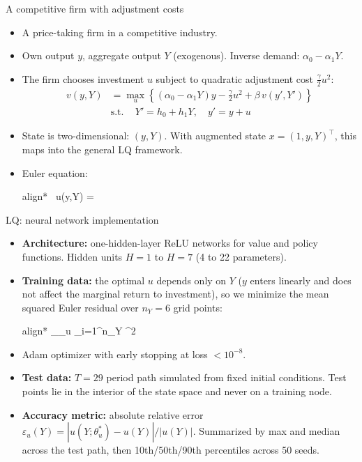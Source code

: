 \documentclass[aspectratio=169,10pt]{beamer}
\newcommand{\emphcolor}[1]{\textbf{\textcolor{emphcolorval}{#1}}}
\newcommand{\st}{\textrm{s.t.}\,}
\begin{document}
\begin{frame}{A competitive firm with adjustment costs}
	\begin{itemize}
		\item A price-taking firm in a competitive industry.
		\item Own output $y$, aggregate output $Y$ (exogenous). Inverse demand: $\alpha_0 - \alpha_1 Y$.
		\item The firm chooses investment $u$ subject to quadratic adjustment cost $\tfrac{\gamma}{2}u^2$:
		\begin{align*}
			v(y,Y) &= \max_u \left\{ (\alpha_0 - \alpha_1 Y)y - \tfrac{\gamma}{2}u^2 + \beta\, v(y',Y') \right\} \\
			&\st\quad Y' = h_0 + h_1 Y, \quad y' = y + u
		\end{align*}
		\item State is two-dimensional: $(y,Y)$. With augmented state $x = (1, y, Y)^\top$, this maps into the general LQ framework.
		\item Euler equation:
		\begin{empheq}[box=\tcbhighmath]{align*}
			\gamma\, u(y,Y) = \beta{}
		\end{empheq}
	\end{itemize}
\end{frame}


\begin{frame}[label=lq-nn-impl]{LQ: neural network implementation}
	\begin{itemize}
		\item \emphcolor{Architecture:} one-hidden-layer ReLU networks for value and policy functions. Hidden units $H = 1$ to $H = 7$ (4 to 22 parameters).
		\item \emphcolor{Training data:} the optimal $u$ depends only on $Y$ ($y$ enters linearly and does not affect the marginal return to investment), so we minimize the mean squared Euler residual over $n_Y = 6$ grid points:
		\begin{empheq}[box=\tcbhighmath]{align*}
			\min_{\theta_u}  \sum_{i=1}^{n_Y} ^2
		\end{empheq}
		\item Adam optimizer with early stopping at loss $< 10^{-8}$.
		\item \emphcolor{Test data:} $T = 29$ period path simulated from fixed initial conditions. Test points lie in the interior of the state space and never on a training node.
		\item \emphcolor{Accuracy metric:} absolute relative error $\varepsilon_u(Y) = |u(Y;\theta_u^*) - u(Y)| / |u(Y)|$. Summarized by max and median across the test path, then 10th/50th/90th percentiles across 50 seeds.
	\end{itemize}
	\vspace{0.05in}
	\hfill\hyperlink{lq-param}{}
\end{frame}
\end{document}
